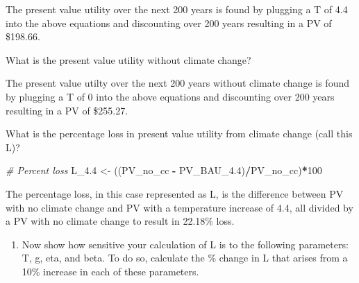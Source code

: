 \documentclass[]{article}
\newenvironment{Shaded}{\begin{snugshade}}{\end{snugshade}}
\newcommand{\CommentTok}[1]{\textcolor[rgb]{0.56,0.35,0.01}{\textit{#1}}}
\newcommand{\DataTypeTok}[1]{\textcolor[rgb]{0.13,0.29,0.53}{#1}}
\newcommand{\DecValTok}[1]{\textcolor[rgb]{0.00,0.00,0.81}{#1}}
\newcommand{\FloatTok}[1]{\textcolor[rgb]{0.00,0.00,0.81}{#1}}
\newcommand{\KeywordTok}[1]{\textcolor[rgb]{0.13,0.29,0.53}{\textbf{#1}}}
\newcommand{\NormalTok}[1]{#1}
\newcommand{\OperatorTok}[1]{\textcolor[rgb]{0.81,0.36,0.00}{\textbf{#1}}}
\newcommand{\StringTok}[1]{\textcolor[rgb]{0.31,0.60,0.02}{#1}}
\providecommand{\tightlist}{%
  \setlength{\itemsep}{0pt}\setlength{\parskip}{0pt}}
\begin{document}
The present value utility over the next 200 years is found by plugging a
T of 4.4 into the above equations and discounting over 200 years
resulting in a PV of \$198.66.

What is the present value utility without climate change?

\begin{Shaded}
\end{Shaded}

The present value utilty over the next 200 years without climate change
is found by plugging a T of 0 into the above equations and discounting
over 200 years resulting in a PV of \$255.27.

What is the percentage loss in present value utility from climate change
(call this L)?

\begin{Shaded}
\begin{Highlighting}[]
\CommentTok{# Percent loss }
\NormalTok{L_}\FloatTok{4.4}\NormalTok{ <-}\StringTok{ }\NormalTok{((PV_no_cc }\OperatorTok{-}\StringTok{ }\NormalTok{PV_BAU_}\FloatTok{4.4}\NormalTok{)}\OperatorTok{/}\NormalTok{PV_no_cc)}\OperatorTok{*}\DecValTok{100}
\end{Highlighting}
\end{Shaded}

The percentage loss, in this case represented as L, is the difference
between PV with no climate change and PV with a temperature increase of
4.4, all divided by a PV with no climate change to result in 22.18\%
loss.

\begin{enumerate}
\def\labelenumi{(\alph{enumi})}
\setcounter{enumi}{1}
\tightlist
\item
  Now show how sensitive your calculation of L is to the following
  parameters: T, g, eta, and beta. To do so, calculate the \% change in
  L that arises from a 10\% increase in each of these parameters.
\end{enumerate}
\end{document}
